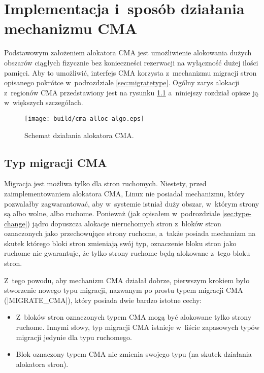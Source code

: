 \chapter{Implementacja i~sposób działania mechanizmu CMA}\label{sec:implementation}

Podstawowym założeniem alokatora CMA jest umożliwienie alokowania
dużych obszarów ciągłych fizycznie bez konieczneści rezerwacji na
wyłączność dużej ilości pamięci.  Aby to umożliwić, interfejs CMA
korzysta z~mechanizmu migracji stron opisanego pokrótce w~podrozdziale
\ref{sec:migratetype}.  Ogólny zarys alokacji z~regionów CMA
przedstawiony jest na rysunku \ref{fig:cma-alloc-algo} a~niniejszy
rozdział opisze ją w~większych szczegółach.

\begin{figure}[tbp]
  \texttt{[image: build/cma-alloc-algo.eps]}
  \caption{Schemat działania alokatora CMA.}
  \label{fig:cma-alloc-algo}
\end{figure}

\section{Typ migracji CMA}\label{sec:migrate-cma}

Migracja jest możliwa tylko dla stron ruchomych.  Niestety, przed
zaimplementowaniem alokatora CMA, Linux nie posiadał mechanizmu,
który pozwalałby zagwarantować, aby w~systemie istniał duży obszar,
w~którym strony są albo wolne, albo ruchome.  Ponieważ (jak opisałem
w~podrozdziale \ref{sec:type-change}) jądro dopuszcza alokacje
nieruchomych stron z~bloków stron oznaczonych jako przechowujące
strony ruchome, a~także posiada mechanizm na skutek którego bloki
stron zmieniają swój typ, oznaczenie bloku stron jako ruchome nie
gwarantuje, że tylko strony ruchome będą alokowane z~tego bloku stron.

Z~tego powodu, aby mechanizm CMA działał dobrze, pierwszym krokiem
było stworzenie nowego typu migracji, nazwanym po prostu typem
migracji CMA (\code|MIGRATE_CMA|), który posiada dwie bardzo istotne
cechy:

\begin{itemize}
\item Z~bloków stron oznaczonych typem CMA mogą być alokowane tylko
  strony ruchome.  Innymi słowy, typ migracji CMA istnieje w~liście
  zapasowych typów migracji jedynie dla typu ruchomego.
\item Blok oznaczony typem CMA nie zmienia swojego typu (na skutek
  działania alokatora stron).
\end{itemize}

